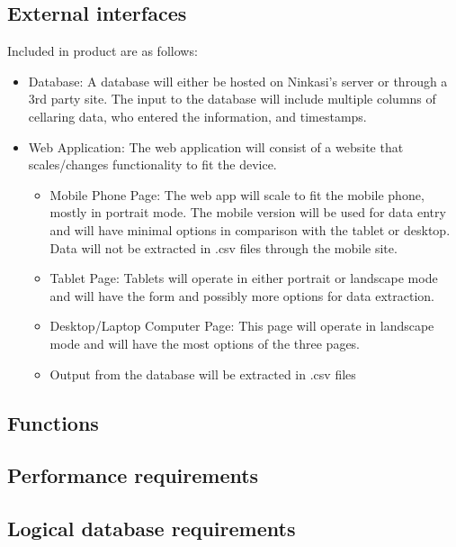 \documentclass[draftclsnofoot,onecolumn,letterpaper,10pt,compsoc]{IEEEtran}
\begin{document}
	\subsection{External interfaces}
    Included in product are as follows:
        \begin{itemize}
            \item{Database: A database will either be hosted on Ninkasi's server or through a 3rd party site. The input to the database will include multiple columns of cellaring data, who entered the information, and timestamps. }
            
            \item{Web Application:}
            The web application will consist of a website that scales/changes functionality to fit the device.
                \begin{itemize}
                    \item{Mobile Phone Page: The web app will scale to fit the mobile phone, mostly in portrait mode. The mobile version will be used for data entry and will have minimal options in comparison with the tablet or desktop. Data will not be extracted in .csv files through the mobile site.}
                    
                    \item{Tablet Page: Tablets will operate in either portrait or landscape mode and will have the form and possibly more options for data extraction.}
                    
                    \item{Desktop/Laptop Computer Page: This page will operate in landscape mode and will have the most options of the three pages.}
                    
                    \item{Output from the database will be extracted in .csv files}
                \end{itemize}
        \end{itemize}
        
	\subsection{Functions}
	\subsection{Performance requirements}
	\subsection{Logical database requirements}
\end{document}
